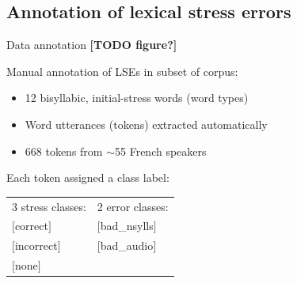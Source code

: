 \documentclass[xcolor={dvipsnames}]{beamer}
\newcommand{\TODO}[1]{{\color{red}\textbf{[TODO #1]}}}
\begin{document}
\subsection{Annotation of lexical stress errors}
\begin{frame}{Data annotation \TODO{figure?}}
	
	Manual annotation of LSEs in subset of corpus:\\
	\begin{itemize}
	\item{12 bisyllabic, initial-stress words (word types)
	}
	\item{Word utterances (tokens) extracted automatically}
	\item{%
	668 tokens from $\sim$55 French speakers}
	\end{itemize}

	\vfill
	Each token assigned a class label:
	\begin{center}
	\begin{tabular}{ll}
	3 stress classes: & 2 error classes: \\
	$[$correct$]$ &  $[$bad\_nsylls$]$ \\
	$[$incorrect$]$ &  $[$bad\_audio$]$ \\
	$[$none$]$ & \\
	\end{tabular}
	\end{center}
	
	
\end{frame}
\end{document}
